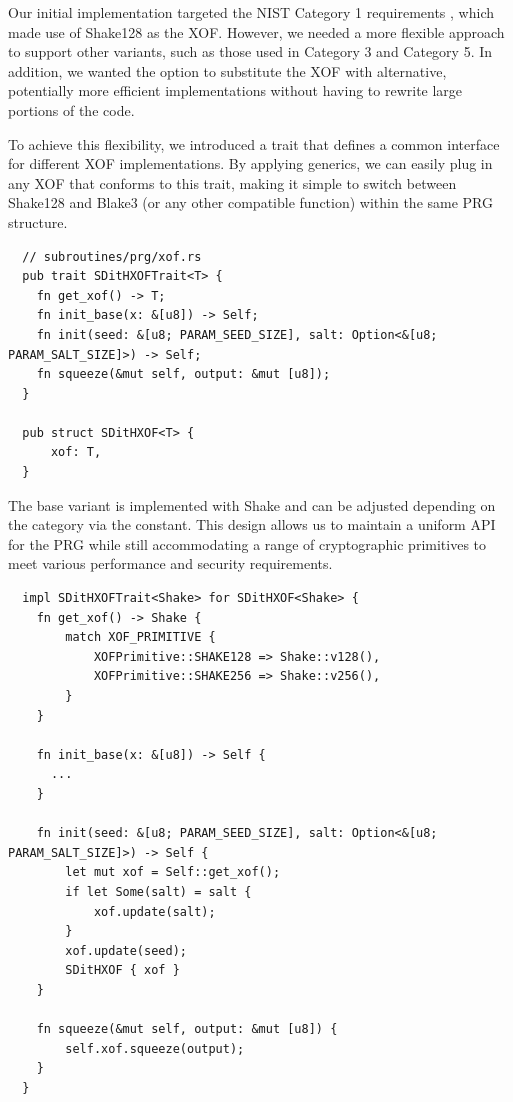\documentclass[11pt]{report}
\theoremstyle{definition}
\theoremstyle{plain}
\begin{document}
Our initial implementation targeted the NIST Category 1 requirements \cite{aguilarsyndrome11}, which made use of Shake128 \cite{aguilarsyndrome11} as the XOF. However, we needed a more flexible approach to support other variants, such as those used in Category 3 and Category 5. In addition, we wanted the option to substitute the XOF with alternative, potentially more efficient implementations without having to rewrite large portions of the code.

To achieve this flexibility, we introduced a trait that defines a common interface for different XOF implementations. By applying generics, we can easily plug in any XOF that conforms to this trait, making it simple to switch between Shake128 and Blake3 (or any other compatible function) within the same PRG structure.

\begin{verbatim}
  // subroutines/prg/xof.rs
  pub trait SDitHXOFTrait<T> {
    fn get_xof() -> T;
    fn init_base(x: &[u8]) -> Self;
    fn init(seed: &[u8; PARAM_SEED_SIZE], salt: Option<&[u8; PARAM_SALT_SIZE]>) -> Self;
    fn squeeze(&mut self, output: &mut [u8]);
  }

  pub struct SDitHXOF<T> {
      xof: T,
  }
\end{verbatim}

The base variant is implemented with Shake and can be adjusted depending on the category via the  constant. This design allows us to maintain a uniform API for the PRG while still accommodating a range of cryptographic primitives to meet various performance and security requirements.

\begin{verbatim}
  impl SDitHXOFTrait<Shake> for SDitHXOF<Shake> {
    fn get_xof() -> Shake {
        match XOF_PRIMITIVE {
            XOFPrimitive::SHAKE128 => Shake::v128(),
            XOFPrimitive::SHAKE256 => Shake::v256(),
        }
    }

    fn init_base(x: &[u8]) -> Self {
      ...
    }

    fn init(seed: &[u8; PARAM_SEED_SIZE], salt: Option<&[u8; PARAM_SALT_SIZE]>) -> Self {
        let mut xof = Self::get_xof();
        if let Some(salt) = salt {
            xof.update(salt);
        }
        xof.update(seed);
        SDitHXOF { xof }
    }

    fn squeeze(&mut self, output: &mut [u8]) {
        self.xof.squeeze(output);
    }
  }
\end{verbatim}
\end{document}
